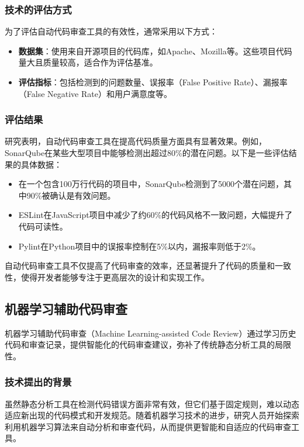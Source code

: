 \documentclass{article}
\begin{document}
\subsubsection{技术的评估方式}

为了评估自动代码审查工具的有效性，通常采用以下方式：

\begin{itemize}
    \item \textbf{数据集}：使用来自开源项目的代码库，如Apache、Mozilla等。这些项目代码量大且质量较高，适合作为评估基准。
    \item \textbf{评估指标}：包括检测到的问题数量、误报率（False Positive Rate）、漏报率（False Negative Rate）和用户满意度等。
\end{itemize}

\subsubsection{评估结果}

研究表明，自动代码审查工具在提高代码质量方面具有显著效果。例如，SonarQube在某些大型项目中能够检测出超过80\%的潜在问题。以下是一些评估结果的具体数据：

\begin{itemize}
    \item 在一个包含100万行代码的项目中，SonarQube检测到了5000个潜在问题，其中90\%被确认是有效问题。
    \item ESLint在JavaScript项目中减少了约60\%的代码风格不一致问题，大幅提升了代码可读性。
    \item Pylint在Python项目中的误报率控制在5\%以内，漏报率则低于2\%。
\end{itemize}

自动代码审查工具不仅提高了代码审查的效率，还显著提升了代码的质量和一致性，使得开发者能够专注于更高层次的设计和实现工作。

\subsection{机器学习辅助代码审查}

机器学习辅助代码审查（Machine Learning-assisted Code Review）通过学习历史代码和审查记录，提供智能化的代码审查建议，弥补了传统静态分析工具的局限性。

\subsubsection{技术提出的背景}

虽然静态分析工具在检测代码错误方面非常有效，但它们基于固定规则，难以动态适应新出现的代码模式和开发规范。随着机器学习技术的进步，研究人员开始探索利用机器学习算法来自动分析和审查代码，从而提供更智能和自适应的代码审查工具。
\end{document}
